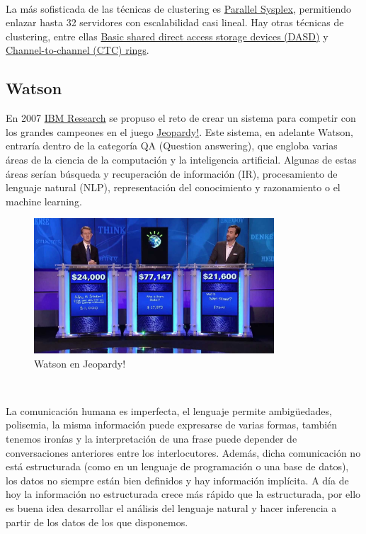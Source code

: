 \documentclass[paper=a4, fontsize=10pt]{scrartcl} %
\numberwithin{equation}{section} %
\numberwithin{figure}{section} %
\numberwithin{table}{section} %
\begin{document}
\

La más sofisticada de las técnicas de clustering es \href{https://www.ibm.com/support/knowledgecenter/zosbasics/com.ibm.zos.zmainframe/zconc_clusterPlSys.htm?view=embed}{Parallel Sysplex}, permitiendo enlazar hasta 32 servidores con escalabilidad casi lineal. 
Hay otras técnicas de clustering, entre ellas \href{https://www.ibm.com/support/knowledgecenter/zosbasics/com.ibm.zos.zmainframe/zconc_clusterDASD.htm?view=embed}{Basic shared direct access storage devices (DASD)} y  \href{https://www.ibm.com/support/knowledgecenter/zosbasics/com.ibm.zos.zmainframe/zconc_clusterCTC.htm?view=embed}{Channel-to-channel (CTC) rings}.


\subsection{Watson}
En 2007 \href{https://www.research.ibm.com/}{IBM Research} se propuso el reto de crear un sistema para competir con los grandes campeones en el juego \href{https://www.jeopardy.com/}{Jeopardy!}. 
Este sistema, en adelante Watson, entraría dentro de la categoría QA (Question answering), que engloba varias áreas de la ciencia de la computación y la inteligencia artificial. 
Algunas de estas áreas serían búsqueda y recuperación de información (IR), procesamiento de lenguaje natural (NLP), representación del conocimiento y razonamiento o el machine learning.

\begin{figure}[H]
	\centering
	\label{j-watson}
	\includegraphics[width=0.8\textwidth]{./Imagenes/j-watson.jpg}
	\caption{Watson en Jeopardy!}
\end{figure}

\

La comunicación humana es imperfecta, el lenguaje permite ambigüedades, polisemia, la misma información puede expresarse de varias formas, también tenemos ironías y la interpretación de una frase puede depender de conversaciones anteriores entre los interlocutores.
Además, dicha comunicación no está estructurada (como en un lenguaje de programación o una base de datos), los datos no siempre están bien definidos y hay información implícita.
A día de hoy la información no estructurada crece más rápido que la estructurada, por ello es buena idea desarrollar el análisis del lenguaje natural y hacer inferencia a partir de los datos de los que disponemos.
\end{document}
